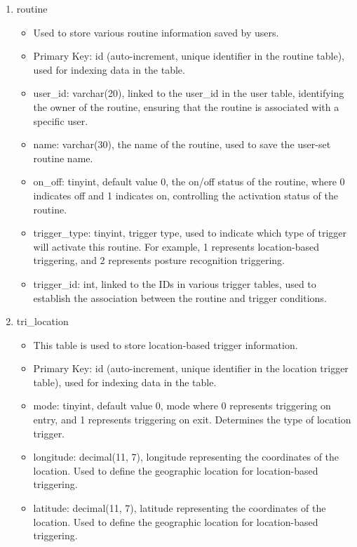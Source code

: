 \begin{enumerate}
\begin{enumerate}
                        \item routine
                              \begin{itemize}
                                  \item Used to store various routine information saved by users.
                                  \item Primary Key: id (auto-increment, unique identifier in the routine table), used for indexing data in the table.
                                  \item user\_id: varchar(20), linked to the user\_id in the user table, identifying the owner of the routine, ensuring that the routine is associated with a specific user.
                                  \item name: varchar(30), the name of the routine, used to save the user-set routine name.
                                  \item on\_off: tinyint, default value 0, the on/off status of the routine, where 0 indicates off and 1 indicates on, controlling the activation status of the routine.
                                  \item trigger\_type: tinyint, trigger type, used to indicate which type of trigger will activate this routine. For example, 1 represents location-based triggering, and 2 represents posture recognition triggering.
                                  \item trigger\_id: int, linked to the IDs in various trigger tables, used to establish the association between the routine and trigger conditions.\\
                              \end{itemize}

                        \item tri\_location
                              \begin{itemize}
                                  \item This table is used to store location-based trigger information.
                                  \item Primary Key: id (auto-increment, unique identifier in the location trigger table), used for indexing data in the table.
                                  \item mode: tinyint, default value 0, mode where 0 represents triggering on entry, and 1 represents triggering on exit. Determines the type of location trigger.
                                  \item longitude: decimal(11, 7), longitude representing the coordinates of the location. Used to define the geographic location for location-based triggering.
                                  \item latitude: decimal(11, 7), latitude representing the coordinates of the location. Used to define the geographic location for location-based triggering.\\
                              \end{itemize}


\end{enumerate}
\end{enumerate}
